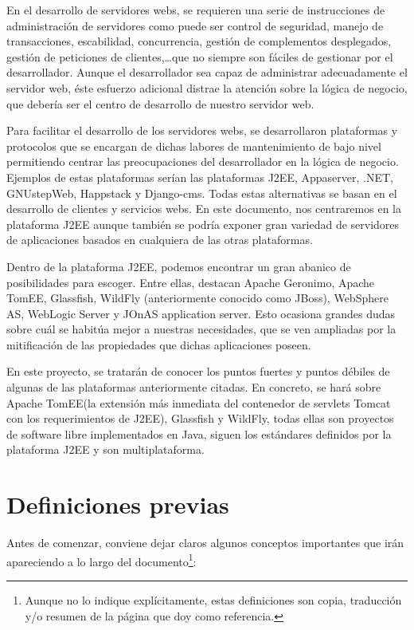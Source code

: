 \documentclass[a4paper, 10pt]{article}
\begin{document}
	En el desarrollo de servidores webs, se requieren una serie de instrucciones de
	administración de servidores como puede ser control de seguridad, manejo de
	transacciones, escabilidad, concurrencia, gestión de complementos desplegados,
	gestión de peticiones de clientes,\dots que no siempre son fáciles de gestionar por
	el desarrollador. Aunque el desarrollador sea capaz de administrar adecuadamente el
	servidor web, éste esfuerzo adicional distrae la atención sobre la lógica de negocio,
	que debería ser el centro de desarrollo de nuestro servidor web.
	
	Para facilitar el desarrollo de los servidores webs, se desarrollaron plataformas y
	protocolos que se encargan de dichas labores de mantenimiento de bajo nivel permitiendo
	centrar las preocupaciones del desarrollador en la lógica de negocio. Ejemplos de estas
	plataformas serían las plataformas J2EE, Appaserver, .NET, GNUstepWeb, Happstack y
	Django-cms. Todas estas alternativas se basan en el desarrollo de clientes y servicios
	webs. En este documento, nos centraremos en la plataforma J2EE aunque también se podría
	exponer gran variedad de servidores de aplicaciones basados en cualquiera de las otras
	plataformas.
	
	Dentro de la plataforma J2EE, podemos encontrar un gran abanico de posibilidades para
	escoger. Entre ellas, destacan Apache Geronimo, Apache TomEE, Glassfish, WildFly
	(anteriormente conocido como JBoss), WebSphere AS, WebLogic Server y JOnAS application
	server. Esto ocasiona grandes dudas sobre cuál se habitúa mejor a nuestras necesidades,
	que se ven ampliadas por la mitificación de las propiedades que dichas aplicaciones
	poseen.
	
	En este proyecto, se tratarán de conocer los puntos fuertes y puntos débiles de algunas
	de las plataformas anteriormente citadas. En concreto, se hará sobre Apache TomEE(la
	extensión más inmediata del contenedor de servlets Tomcat con los requerimientos de
	J2EE), Glassfish y WildFly, todas ellas son proyectos de software libre implementados
	en Java, siguen los estándares definidos por la plataforma J2EE y son multiplataforma.
	
	
\section{Definiciones previas}
	Antes de comenzar, conviene dejar claros algunos conceptos importantes que irán
	apareciendo	a lo largo del documento\footnote{Aunque no lo indique explícitamente,
	estas definiciones son copia, traducción y/o resumen de la página que doy como
	referencia.}:
\end{document}
